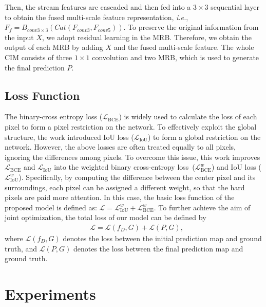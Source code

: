 \documentclass[lettersize,journal]{IEEEtran}
\def\ie{\emph{i.e.}}
\begin{document}
Then, the stream features are cascaded and then fed into a $3\times{3}$ sequential layer to obtain the fused multi-scale feature representation, \ie, $F_{f}=B_{conv3\times{3}}(Cat(F_{conv3}, F_{conv5}))$. To preserve the original information from the input $X$, we adopt residual learning in the MRB. Therefore, we obtain the output of each MRB by adding $X$ and the fused multi-scale feature. The whole CIM consists of three $1\times{1}$ convolution and two MRB, which is used to generate the final prediction $P$.

\subsection{Loss Function}

The binary-cross entropy loss ($\mathcal{L}_\text{BCE}$) is widely used to calculate the loss of each pixel to form a pixel restriction on the network. To effectively exploit the global structure, the work \cite{basnet} introduced IoU loss ($\mathcal{L}_\text{IoU}$) to form a global restriction on the network. However, the above losses are often treated equally to all pixels, ignoring the differences among pixels. To overcome this issue, this work \cite{f3net} improves $\mathcal{L}_\text{BCE}$ and $\mathcal{L}_\text{IoU}$ into the weighted binary cross-entropy loss~($\mathcal{L}_\text{BCE}^w$) and IoU loss ($\mathcal{L}_\text{IoU}^w$). Specifically, by computing the difference between the center pixel and its surroundings, each pixel can be assigned a different weight, so that the hard pixels are paid more attention. In this case, the basic loss function of the proposed model is defined as: $\mathcal{L} = \mathcal{L}_\text{IoU}^w + \mathcal{L}_\text{BCE}^w$. To further achieve the aim of joint optimization, the total loss of our model can be defined by
\begin{align}
& \mathcal{L}= \mathcal{L}(f_D,G)+\mathcal{L}(P,G),
\end{align}%
where $\mathcal{L}(f_D,G)$ denotes the loss between the initial prediction map and ground truth, and $\mathcal{L}(P,G)$ denotes the loss between the final prediction map and ground truth.

\section{Experiments}\label{sec:experiments}
\end{document}
